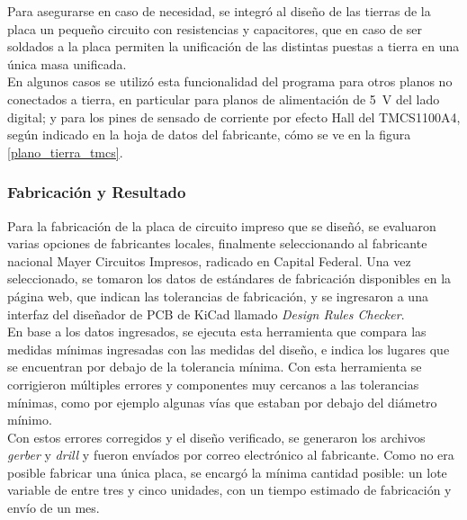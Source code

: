Para asegurarse en caso de necesidad, se integró al diseño de las tierras de la placa un pequeño circuito con resistencias y capacitores, que en caso de ser soldados a la placa permiten la unificación de las distintas puestas a tierra en una única masa unificada.\\

En algunos casos se utilizó esta funcionalidad del programa para otros planos
no conectados a tierra, en particular para planos de alimentación de \SI[]{5}{\volt} del lado digital; y para los pines de sensado de corriente por efecto Hall del TMCS1100A4, según indicado en la hoja de datos del fabricante, cómo se ve en la figura \ref{plano_tierra_tmcs}.

\subsubsection{Fabricación y Resultado}

Para la fabricación de la placa de circuito impreso que se diseñó, se evaluaron varias opciones de fabricantes locales, finalmente seleccionando al fabricante nacional {\Medium Mayer Circuitos Impresos}, radicado en Capital Federal. Una vez seleccionado, se tomaron los datos de estándares de fabricación disponibles en la página web, que indican las tolerancias de fabricación, y se ingresaron a una interfaz del diseñador de PCB de KiCad llamado \textit{Design Rules Checker}.\\

En base a los datos ingresados, se ejecuta esta herramienta que compara las medidas mínimas ingresadas con las medidas del diseño, e indica los lugares que se encuentran por debajo de la tolerancia mínima. Con esta herramienta se corrigieron múltiples errores y componentes muy cercanos a las tolerancias mínimas, como por ejemplo algunas vías que estaban por debajo del diámetro mínimo.\\

Con estos errores corregidos y el diseño verificado, se generaron los archivos \textit{gerber} y \textit{drill} y fueron envíados por correo electrónico al fabricante. Como no era posible fabricar una única placa, se encargó la mínima cantidad posible: un lote variable de entre tres y cinco unidades, con un tiempo estimado de fabricación y envío de un mes.\\

